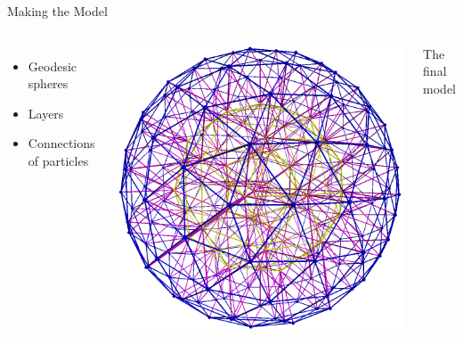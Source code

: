 \documentclass{beamer}
\begin{document}
\begin{frame}{Making the Model}
\begin{columns}

\begin{itemize}
\item Geodesic spheres
\item Layers
\item Connections of particles
\end{itemize}

\includegraphics[width = 1.0\textwidth]{ball_spring_model.png}\\
\begin{center} \scriptsize The final model \end{center}

\end{columns}
\end{frame}
\end{document}
